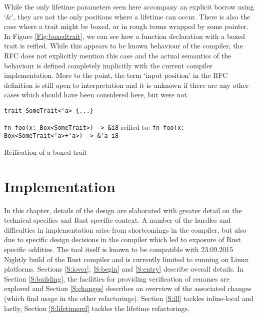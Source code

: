 While the only lifetime parameters seen here accompany an explicit borrow using `\&', they are not the only positions where a lifetime can occur. There is also the case where a trait might be boxed, or in rough terms wrapped by some pointer. In Figure \ref{Fig:boxedtrait}, we can see how a function declaration with a boxed trait is reified. While this appears to be known behaviour of the compiler, the RFC does not explicitly mention this case and the actual semantics of the behaviour is defined completely implicitly with the current compiler implementation. More to the point, the term `input position' in the RFC definition is still open to interpretation and it is unknown if there are any other cases which should have been considered here, but were not.

\begin{fig}
\begin{verbatim}
trait SomeTrait<'a> {...}
\end{verbatim}
{\verb|fn foo(x: Box<SomeTrait>) -> &i8|}\newline
reified to: {\verb|fn foo(x: Box<SomeTrait<'a>+'a>) -> &'a i8|}
\caption{Reification of a boxed trait}
\label{Fig:boxedtrait}
\end{fig}



\chapter{Implementation}\label{C:impl}

In this chapter, details of the design are elaborated with greater detail on the technical specifics and Rust specific context. A number of the hurdles and difficulties in implementation arise from shortcomings in the compiler, but also due to specific design decisions in the compiler which led to exposure of Rust specific oddities. The tool itself is known to be compatible with 23.09.2015 Nightly build of the Rust compiler and is currently limited to running on Linux platforms. Sections \ref{S:iover}, \ref{S:begin} and \ref{S:entry} describe overall details. In Section \ref{S:building}, the facilities for providing verification of renames are explored and Section \ref{S:changes} describes an overview of the associated changes (which find usage in the other refactorings). Section \ref{S:ill} tackles inline-local and lastly, Section \ref{S:lifetimeref} tackles the lifetime refactorings.


